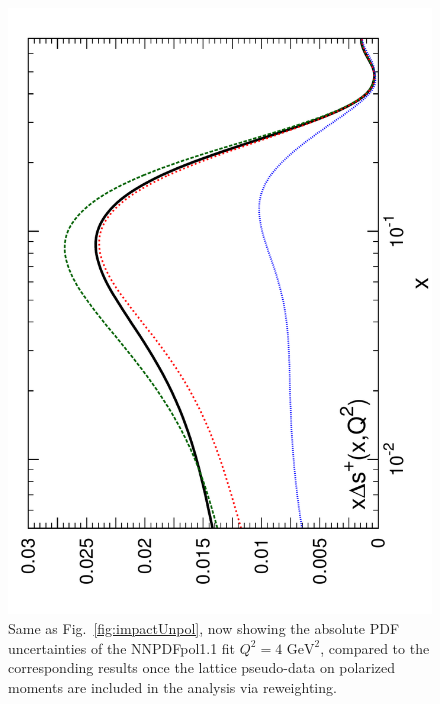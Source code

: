 \begin{figure}[!t]
\includegraphics[angle=270,scale=0.35]{plots/POLs}
\caption{\small Same as Fig.~\ref{fig:impactUnpol}, now
  showing the absolute PDF uncertainties of the NNPDFpol1.1 fit
  $Q^2=4\text{ GeV}^2$, compared to the corresponding results once the lattice 
  pseudo-data on polarized moments are included in the analysis via reweighting.
}    
\label{fig:impactPol}
\end{figure}

